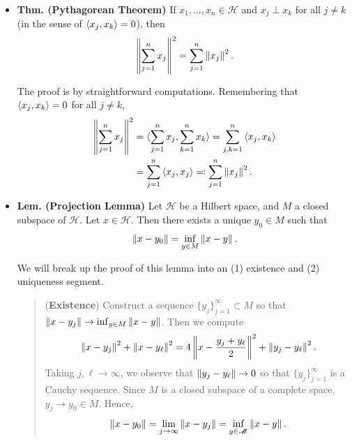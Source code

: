 \documentclass{article}
\begin{document}
\begin{itemize}
	\item \textbf{Thm. (Pythagorean Theorem)} If $x_{1}, \ldots, x_{n} \in \mathscr{H}$ and $x_{j} \perp x_{k}$ for all $j \neq k$ (in the sense of $\braket{x_{j}, x_{k}} = 0$), then 
	\begin{equation*}
		\left\Vert \sum_{j= 1}^{n}x_{j} \right\Vert^{2} = \sum_{j = 1}^{n}\left\Vert x_{j} \right\Vert^{2}. 
	\end{equation*}
	\begin{solutions}
		The proof is by straightforward computations. Remembering that $\braket{x_{j}, x_{k}} = 0$ for all $j \neq k$, 
		\begin{align}
			\begin{split}
				\left\Vert \sum_{j =1}^{n}x_{j} \right\Vert^{2} &= \braket{\sum_{j = 1}^{n}x_{j}, \sum_{k = 1}^{n}x_{k}} = \sum_{j,k = 1}^{n}\braket{x_{j}, x_{k}} \\
				&= \sum_{j = 1}^{n}\braket{x_{j},x_{j}} \eqqcolon \sum_{j = 1}^{n}\left\Vert x_{j} \right\Vert^{2}. 
			\end{split}
		\end{align}
	\end{solutions}
	\item \textbf{Lem. (Projection Lemma)} Let $\mathscr{H}$ be a Hilbert space, and $M$ a closed subspace of $\mathscr{H}$. Let $x \in \mathscr{H}$. Then there exists a unique $y_{0} \in M$ such that 
	\begin{equation*}
		\left\Vert x - y_{0} \right\Vert = \inf_{y \in M}\left\Vert x - y \right\Vert. 
	\end{equation*}
	\begin{solutions}
		We will break up the proof of this lemma into an (1) existence and (2) uniqueness segment. 
		\begin{quote}
			(\textbf{Existence}) Construct a sequence $\{y_{j}\}_{j = 1}^{\infty} \subset M$ so that $\left\Vert x - y_{j} \right\Vert \to \inf_{y \in M}\left\Vert x - y \right\Vert$. Then we compute 
			\begin{align}
				\begin{split}
					\left\Vert x - y_{j} \right\Vert^{2} + \left\Vert x - y_{\ell} \right\Vert^{2} = 4 \left\Vert  x- \frac{y_{j} + y_{\ell}}{2} \right\Vert^{2} + \left\Vert y_{j} - y_{\ell} \right\Vert^{2}. 
				\end{split}
			\end{align}
			Taking $j, \ell \to \infty$, we observe that $\left\Vert y_{j} - y_{\ell} \right\Vert \to 0$ so that $\{y_{j}\}_{j = 1}^{\infty}$ is a Cauchy sequence. Since $M$ is a closed subspace of a complete space, $y_{j} \to y_{0} \in M$. Hence, 
			\begin{equation}
				\norm{x - y_{0}} = \lim_{j \to \infty}\norm{x - y_{j}} = \inf_{y \in \mathscr{M}}\norm{x - y}. 

\end{equation}
\end{quote}
\end{solutions}
\end{itemize}
\end{document}
